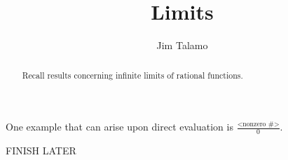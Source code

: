 \documentclass{ximera}
\author{Jim Talamo}
\title[Refresh:]{Limits}
\begin{document}
\begin{abstract}
Recall results concerning infinite limits of rational functions.
\end{abstract}
\maketitle

\begin{problem}
One example that can arise upon direct evaluation is $\frac{\textrm{<nonzero #>}}{0}$.  

FINISH LATER


\end{problem}
\end{document}
